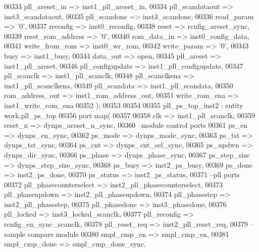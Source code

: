 \begin{DoxyCode}
00333       pll_areset_in        => inst1_pll_areset_in,
00334       pll_scandataout      => inst3_scandataout,
00335       pll_scandone         => inst3_scandone,
00336       read_param           => '0',
00337       reconfig             => inst0_reconfig,
00338       reset                => rcnfig_areset_sync,
00339       reset_rom_address    => '0',
00340       rom_data_in          => inst0_config_data,
00341       write_from_rom       => inst0_wr_rom,
00342       write_param          => '0',
00343       busy                 => inst1_busy,
00344       data_out             => \textcolor{keywordflow}{open},
00345       pll_areset           => inst1_pll_areset,
00346       pll_configupdate     => inst1_pll_configupdate,
00347       pll_scanclk          => inst1_pll_scanclk,
00348       pll_scanclkena       => inst1_pll_scanclkena,
00349       pll_scandata         => inst1_pll_scandata,
00350       rom_address_out      => inst1_rom_address_out,
00351       write_rom_ena        => inst1_write_rom_ena
00352 \textcolor{vhdlchar}{)};
00353  
00354 
00355 pll\_ps\_top\_inst2 : \textcolor{keywordflow}{entity} work.pll_ps_top
00356    \textcolor{keywordflow}{port} \textcolor{keywordflow}{map}(
00357 
00358       clk                     => inst1_pll_scanclk,
00359       reset_n                 => dynps_areset_n_sync,
00360 \textcolor{keyword}{      --module control ports}
00361       ps_en                   => dynps_en_sync,
00362       ps_mode                 => dynps_mode_sync,
00363       ps_tst                  => dynps_tst_sync, 
00364       ps_cnt                  => dynps_cnt_sel_sync,
00365       ps_updwn                => dynps_dir_sync,
00366       ps_phase                => dynps_phase_sync,
00367       ps_step_size            => dynps_step_size_sync,
00368       ps_busy                 => inst2_ps_busy,
00369       ps_done                 => inst2_ps_done,
00370       ps_status               => inst2_ps_status,
00371 \textcolor{keyword}{      --pll ports}
00372       pll_phasecounterselect  => inst2_pll_phasecounterselect,
00373       pll_phaseupdown         => inst2_pll_phaseupdown, 
00374       pll_phasestep           => inst2_pll_phasestep,        
00375       pll_phasedone           => inst3_phasedone,      
00376       pll_locked              => inst3_locked_scanclk,
00377       pll_reconfig            => rcnfig_en_sync_scanclk,
00378       pll_reset_req           => inst2_pll_reset_req,
00379 \textcolor{keyword}{      --sample compare module}
00380       smpl_cmp_en             => smpl_cmp_en,
00381       smpl_cmp_done           => smpl_cmp_done_sync,

\end{DoxyCode}
